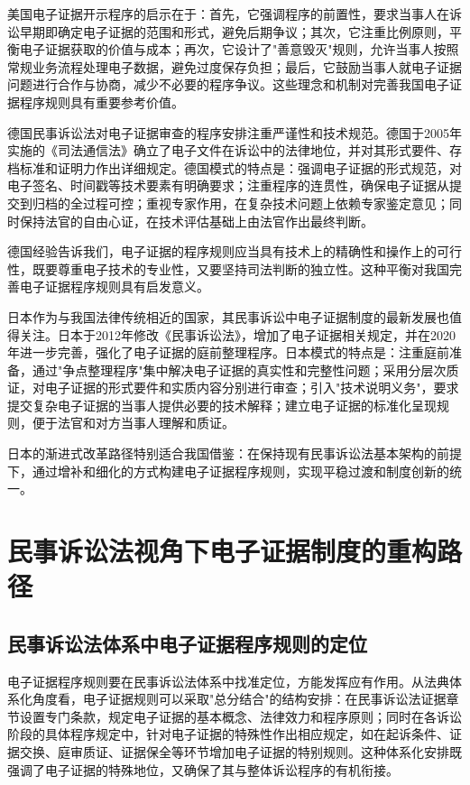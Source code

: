 美国电子证据开示程序的启示在于：首先，它强调程序的前置性，要求当事人在诉讼早期即确定电子证据的范围和形式，避免后期争议；其次，它注重比例原则，平衡电子证据获取的价值与成本；再次，它设计了"善意毁灭"规则，允许当事人按照常规业务流程处理电子数据，避免过度保存负担；最后，它鼓励当事人就电子证据问题进行合作与协商，减少不必要的程序争议。这些理念和机制对完善我国电子证据程序规则具有重要参考价值。

德国民事诉讼法对电子证据审查的程序安排注重严谨性和技术规范。德国于2005年实施的《司法通信法》确立了电子文件在诉讼中的法律地位，并对其形式要件、存档标准和证明力作出详细规定。德国模式的特点是：强调电子证据的形式规范，对电子签名、时间戳等技术要素有明确要求；注重程序的连贯性，确保电子证据从提交到归档的全过程可控；重视专家作用，在复杂技术问题上依赖专家鉴定意见；同时保持法官的自由心证，在技术评估基础上由法官作出最终判断。

德国经验告诉我们，电子证据的程序规则应当具有技术上的精确性和操作上的可行性，既要尊重电子技术的专业性，又要坚持司法判断的独立性。这种平衡对我国完善电子证据程序规则具有启发意义。

日本作为与我国法律传统相近的国家，其民事诉讼中电子证据制度的最新发展也值得关注。日本于2012年修改《民事诉讼法》，增加了电子证据相关规定，并在2020年进一步完善，强化了电子证据的庭前整理程序。日本模式的特点是：注重庭前准备，通过"争点整理程序"集中解决电子证据的真实性和完整性问题；采用分层次质证，对电子证据的形式要件和实质内容分别进行审查；引入"技术说明义务"，要求提交复杂电子证据的当事人提供必要的技术解释；建立电子证据的标准化呈现规则，便于法官和对方当事人理解和质证。

日本的渐进式改革路径特别适合我国借鉴：在保持现有民事诉讼法基本架构的前提下，通过增补和细化的方式构建电子证据程序规则，实现平稳过渡和制度创新的统一。

\section{民事诉讼法视角下电子证据制度的重构路径}

\subsection{民事诉讼法体系中电子证据程序规则的定位}

电子证据程序规则要在民事诉讼法体系中找准定位，方能发挥应有作用。从法典体系化角度看，电子证据规则可以采取"总分结合"的结构安排：在民事诉讼法证据章节设置专门条款，规定电子证据的基本概念、法律效力和程序原则；同时在各诉讼阶段的具体程序规定中，针对电子证据的特殊性作出相应规定，如在起诉条件、证据交换、庭审质证、证据保全等环节增加电子证据的特别规则。这种体系化安排既强调了电子证据的特殊地位，又确保了其与整体诉讼程序的有机衔接。

